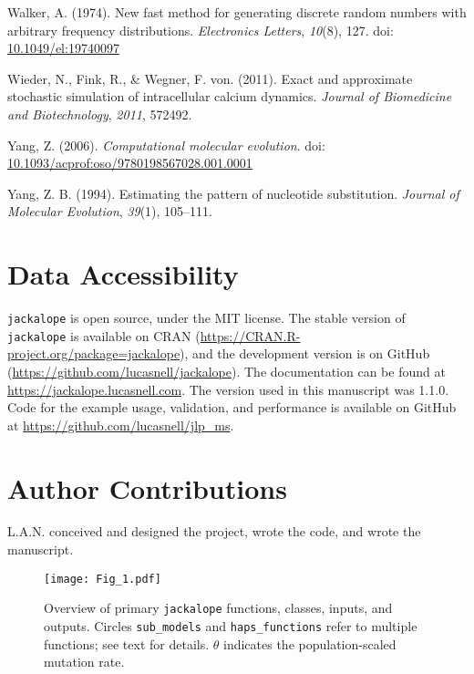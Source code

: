 \documentclass[12pt,]{article}
\begin{document}
\leavevmode\hypertarget{ref-Walker_1974}{}%
Walker, A. (1974). New fast method for generating discrete random numbers with arbitrary frequency distributions. \emph{Electronics Letters}, \emph{10}(8), 127. doi: \href{https://doi.org/10.1049/el:19740097}{10.1049/el:19740097}

\leavevmode\hypertarget{ref-Wieder_2011}{}%
Wieder, N., Fink, R., \& Wegner, F. von. (2011). Exact and approximate stochastic simulation of intracellular calcium dynamics. \emph{Journal of Biomedicine and Biotechnology}, \emph{2011}, 572492.

\leavevmode\hypertarget{ref-Yang_2006}{}%
Yang, Z. (2006). \emph{Computational molecular evolution}. doi: \href{https://doi.org/10.1093/acprof:oso/9780198567028.001.0001}{10.1093/acprof:oso/9780198567028.001.0001}

\leavevmode\hypertarget{ref-Yang_1994}{}%
Yang, Z. B. (1994). Estimating the pattern of nucleotide substitution. \emph{Journal of Molecular Evolution}, \emph{39}(1), 105--111.


\section*{Data Accessibility}

\texttt{jackalope} is open source, under the MIT license.
The stable version of \texttt{jackalope} is available on CRAN
(\url{https://CRAN.R-project.org/package=jackalope}),
and the development version is on GitHub
(\url{https://github.com/lucasnell/jackalope}).
The documentation can be found at \url{https://jackalope.lucasnell.com}.
The version used in this manuscript was 1.1.0.
Code for the example usage, validation, and performance is available on GitHub at
\url{https://github.com/lucasnell/jlp_ms}.

\section*{Author Contributions}

L.A.N. conceived and designed the project, wrote the code, and wrote the manuscript.

\clearpage

\begin{figure}
\centering
\texttt{[image: Fig\_1.pdf]}
\caption{\label{fig:jackalope-overview-figure}Overview of primary \texttt{jackalope} functions, classes, inputs, and outputs. Circles \texttt{sub\_models} and \texttt{haps\_functions} refer to multiple functions; see text for details. \(\theta\) indicates the population-scaled mutation rate.}
\end{figure}
\end{document}
